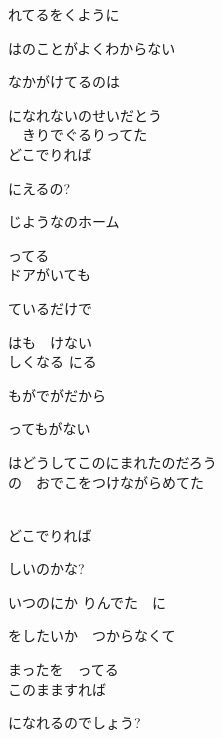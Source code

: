 れてるをくように

はのことがよくわからない

なかがけてるのは

になれないのせいだとう
\\

　きりでぐるりってた
\\

どこでりれば

にえるの?

じようなのホーム

ってる
\\

ドアがいても

ているだけで

はも　けない
\\

しくなる にる

もがでがだから

ってもがない

はどうしてこのにまれたのだろう
\\

の　おでこをつけながらめてた

\\

どこでりれば

しいのかな?

いつのにか りんでた　に

をしたいか　つからなくて

まったを　ってる
\\

このまますれば

になれるのでしょう?

